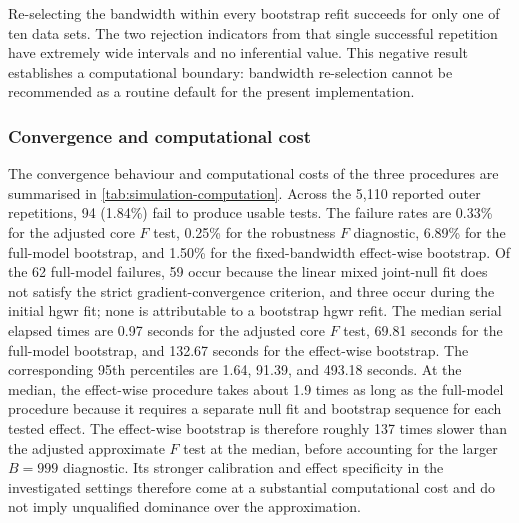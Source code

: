 \documentclass[times]{interact}
\theoremstyle{plain}%
\theoremstyle{definition}
\theoremstyle{remark}
\begin{document}
Re-selecting the bandwidth within every bootstrap refit succeeds for only one of ten data sets.
The two rejection indicators from that single successful repetition have extremely wide intervals and no inferential value.
This negative result establishes a computational boundary: bandwidth re-selection cannot be recommended as a routine default for the present implementation.

\subsubsection{Convergence and computational cost}



The convergence behaviour and computational costs of the three procedures are summarised in \autoref{tab:simulation-computation}.
Across the 5,110 reported outer repetitions, 94 (1.84\%) fail to produce usable tests.
The failure rates are 0.33\% for the adjusted core $F$ test, 0.25\% for the robustness $F$ diagnostic, 6.89\% for the full-model bootstrap, and 1.50\% for the fixed-bandwidth effect-wise bootstrap.
Of the 62 full-model failures, 59 occur because the linear mixed joint-null fit does not satisfy the strict gradient-convergence criterion, and three occur during the initial \gls{hgwr} fit; none is attributable to a bootstrap \gls{hgwr} refit.
The median serial elapsed times are 0.97 seconds for the adjusted core $F$ test, 69.81 seconds for the full-model bootstrap, and 132.67 seconds for the effect-wise bootstrap.
The corresponding 95th percentiles are 1.64, 91.39, and 493.18 seconds.
At the median, the effect-wise procedure takes about 1.9 times as long as the full-model procedure because it requires a separate null fit and bootstrap sequence for each tested effect.
The effect-wise bootstrap is therefore roughly 137 times slower than the adjusted approximate $F$ test at the median, before accounting for the larger $B=999$ diagnostic.
Its stronger calibration and effect specificity in the investigated settings therefore come at a substantial computational cost and do not imply unqualified dominance over the approximation.

\end{document}
